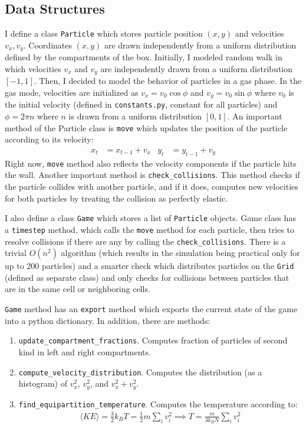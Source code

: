 \documentclass[12pt]{article}
\begin{document}
\subsection{Data Structures}
I define a class \texttt{Particle} which stores particle position $(x,y)$ and velocities $v_x,v_y$. Coordinates $(x,y)$ are drawn independently from a uniform distribution defined by the compartments of the box. Initially, I modeled random walk in which velocities $v_x$ and $v_y$ are independently drawn from a uniform distribution $[-1,1]$. Then, I decided to model the behavior of particles in a gas phase. In the gas mode, velocities are initialized as $v_x=v_0 \cos \phi$ and $v_y=v_0 \sin \phi$ where $v_0$ is the initial velocity (defined in \texttt{constants.py}, constant for all particles) and $\phi=2\pi n$ where $n$ is drawn from a uniform distribution $[0,1]$. An important method of the Particle class is \texttt{move} which updates the position of the particle according to its velocity:
\begin{align}
    x_t &= x_{t-1} + v_x & y_t &= y_{t-1} + v_y
\end{align}
Right now, \texttt{move} method also reflects the velocity components if the particle hits the wall. Another important method is \texttt{check\_collisions}. This method checks if the particle collides with another particle, and if it does, computes new velocities for both particles by treating the collision as perfectly elastic.

I also define a class \texttt{Game} which stores a list of \texttt{Particle} objects. Game class has a \texttt{timestep} method, which calls the \texttt{move} method for each particle, then tries to resolve collisions if there are any by calling the \texttt{check\_collisions}. There is a trivial $O(n^2)$ algorithm (which results in the simulation being practical only for up to 200 particles) and a smarter check which distributes particles on the \texttt{Grid} (defined as separate class) and only checks for collisions between particles that are in the same cell or neighboring cells.

\texttt{Game} method has an \texttt{export} method which exports the current state of the game into a python dictionary. In addition, there are methods:
\begin{enumerate}
    \item \texttt{update\_compartment\_fractions}. Computes fraction of particles of second kind in left and right compartments.
    \item \texttt{compute\_velocity\_distribution}. Computes the distribution (as a histogram) of $v_x^2$, $v_y^2$, and $v_x^2+v_y^2$.
    \item \texttt{find\_equipartition\_temperature}. Computes the temperature according to:
    \begin{align}
        \langle KE \rangle = \frac{3}{2} k_B T = \frac{1}{2} m \sum_i v_i^2 \implies T = \frac{m}{3k_B N} \sum_i v_i^2
    \end{align}
\end{enumerate}
\end{document}
